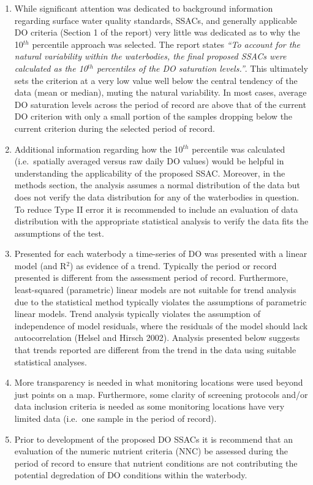 \documentclass[]{interact}
\theoremstyle{plain}%
\theoremstyle{definition}
\theoremstyle{remark}
\begin{document}
\begin{enumerate}
\def\labelenumi{\arabic{enumi}.}
\item
  While significant attention was dedicated to background information
  regarding surface water quality standards, SSACs, and generally
  applicable DO criteria (Section 1 of the report) very little was
  dedicated as to why the 10\(^{th}\) percentile approach was selected.
  The report states \emph{``To account for the natural variability
  within the waterbodies, the final proposed SSACs were calculated as
  the 10\(^{th}\) percentiles of the DO saturation levels.''}. This
  ultimately sets the criterion at a very low value well below the
  central tendency of the data (mean or median), muting the natural
  variability. In most cases, average DO saturation levels across the
  period of record are above that of the current DO criterion with only
  a small portion of the samples dropping below the current criterion
  during the selected period of record.
\item
  Additional information regarding how the 10\(^{th}\) percentile was
  calculated (i.e.~spatially averaged versus raw daily DO values) would
  be helpful in understanding the applicability of the proposed SSAC.
  Moreover, in the methods section, the analysis assumes a normal
  distribution of the data but does not verify the data distribution for
  any of the waterbodies in question. To reduce Type II error it is
  recommended to include an evaluation of data distribution with the
  appropriate statistical analysis to verify the data fits the
  assumptions of the test.
\item
  Presented for each waterbody a time-series of DO was presented with a
  linear model (and R\(^{2}\)) as evidence of a trend. Typically the
  period or record presented is different from the assessment period of
  record. Furthermore, least-squared (parametric) linear models are not
  suitable for trend analysis due to the statistical method typically
  violates the assumptions of parametric linear models. Trend analysis
  typically violates the assumption of independence of model residuals,
  where the residuals of the model should lack autocorrelation (Helsel
  and Hirsch 2002). Analysis presented below suggests that trends
  reported are different from the trend in the data using suitable
  statistical analyses.
\item
  More transparency is needed in what monitoring locations were used
  beyond just points on a map. Furthermore, some clarity of screening
  protocols and/or data inclusion criteria is needed as some monitoring
  locations have very limited data (i.e.~one sample in the period of
  record).
\item
  Prior to development of the proposed DO SSACs it is recommend that an
  evaluation of the numeric nutrient criteria (NNC) be assessed during
  the period of record to ensure that nutrient conditions are not
  contributing the potential degredation of DO conditions within the
  waterbody.
\end{enumerate}
\end{document}
